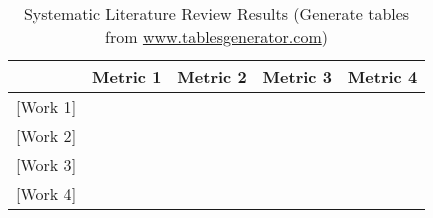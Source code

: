 \begin{table}[htb]
\caption{Systematic Literature Review Results (Generate tables from \url{www.tablesgenerator.com})}
\label{tab:slrtable}
\begin{tabular}{|l|l|l|l|l|}
\hline
             & Metric 1 & Metric 2 & Metric 3 & Metric 4 \\ \hline
{[}Work 1{]} &          &          &          &          \\ \hline
{[}Work 2{]} &          &          &          &          \\ \hline
{[}Work 3{]} &          &          &          &          \\ \hline
{[}Work 4{]} &          &          &          &          \\ \hline
\end{tabular}
\end{table}